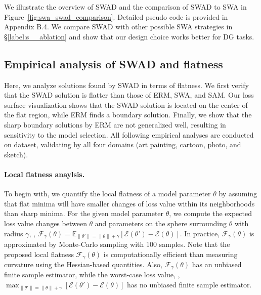 We illustrate the overview of SWAD and the comparison of SWAD to SWA in Figure~\ref{fig:swa_swad_comparison}. Detailed pseudo code is provided in Appendix B.4.
We compare SWAD with other possible SWA strategies in \S\ref{label:s__ablation} and show that our design choice works better for DG tasks.

\subsection{Empirical analysis of SWAD and flatness}
\label{subsection:s__empirical_analysis_of_swad_and_flatness}

% 
% 


Here, we analyze solutions found by SWAD in terms of flatness. We first verify that the SWAD solution is flatter than those of ERM, SWA, and SAM. Our loss surface visualization shows that the SWAD solution is located on the center of the flat region, while ERM finds a boundary solution.
Finally, we show that the sharp boundary solutions by ERM are not generalized well, resulting in sensitivity to the model selection.
All following empirical analyses are conducted on  dataset, validating by all four domains (art painting, cartoon, photo, and sketch).

\paragraph{Local flatness anaylsis.}

To begin with, we quantify the local flatness of a model parameter $\theta$ by assuming that flat minima will have smaller changes of loss value within its neighborhoods than sharp minima.
For the given model parameter $\theta$, we compute the expected loss value changes between $\theta$ and parameters on the sphere surrounding $\theta$ with radius $\gamma$, \ie, $\mathcal{F}_\gamma (\theta)=\mathbb {E}_{\| \theta' \| = \|\theta\| + \gamma} [\mathcal{E}(\theta')-\mathcal{E}(\theta)]$.
In practice, $\mathcal{F}_\gamma(\theta)$ is approximated by Monte-Carlo sampling with 100 samples.
Note that the proposed local flatness $\mathcal{F}_\gamma(\theta)$ is computationally efficient than measuring curvature using the Hessian-based quantities. Also, $\mathcal{F}_\gamma(\theta)$ has an unbiased finite sample estimator, while the worst-case loss value, \ie, $\max_{\| \theta' \| = \|\theta\| + \gamma}[\mathcal{E}(\theta')-\mathcal{E}(\theta)]$ has no unbiased finite sample estimator.


